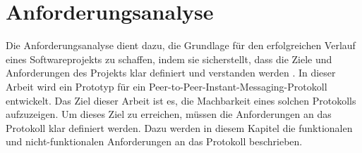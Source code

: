 \chapter{Anforderungsanalyse}
\label{chap:anforderungsanalyse}



Die Anforderungsanalyse dient dazu, die Grundlage für den erfolgreichen Verlauf eines Softwareprojekts zu schaffen, indem sie sicherstellt, dass die Ziele und Anforderungen des Projekts klar definiert und verstanden werden \parencite{Zakharyan_SoftwareRequirementsForMessagingService}. In dieser Arbeit wird ein Prototyp für ein Peer-to-Peer-Instant-Messaging-Protokoll entwickelt. Das Ziel dieser Arbeit ist es, die Machbarkeit eines solchen Protokolls aufzuzeigen. Um dieses Ziel zu erreichen, müssen die Anforderungen an das Protokoll klar definiert werden. Dazu werden in diesem Kapitel die funktionalen und nicht-funktionalen Anforderungen an das Protokoll beschrieben. 




